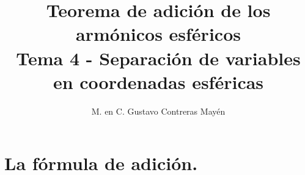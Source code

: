 

\title{Teorema de adición de los armónicos esféricos \\ {\large Tema 4 - Separación de variables en coordenadas esféricas}\vspace{-1ex}}
\author{M. en C. Gustavo Contreras Mayén}
\date{ }

\pagestyle{fancy}
\fancyhf{}
\lhead{\leftmark}
\rfoot{\thepage}
\setlength{\headheight}{16pt}%

\def\changemargin#1#2{\list{}{\rightmargin#2\leftmargin#1}\item[]}
\let\endchangemargin=\endlist 



\maketitle
\fontsize{14}{14}\selectfont
\tableofcontents
\newpage

\section{La fórmula de adición.}

